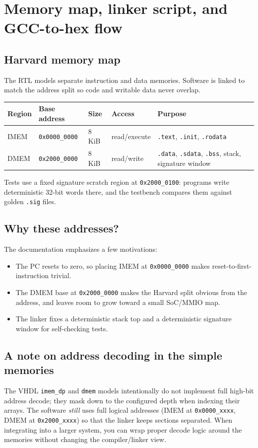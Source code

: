 \section{Memory map, linker script, and GCC-to-hex flow}

\subsection{Harvard memory map}
The RTL models separate instruction and data memories. Software is linked to
match the address split so code and writable data never overlap.

\begin{center}
\begin{tabularx}{\linewidth}{@{}l l l l X@{}}
\toprule
Region & Base address & Size & Access & Purpose \\
\midrule
IMEM & \texttt{0x0000\_0000} & 8 KiB & read/execute & \texttt{.text}, \texttt{.init}, \texttt{.rodata} \\
DMEM & \texttt{0x2000\_0000} & 8 KiB & read/write & \texttt{.data}, \texttt{.sdata}, \texttt{.bss}, stack, signature window \\
\bottomrule
\end{tabularx}
\end{center}

Tests use a fixed signature scratch region at \texttt{0x2000\_0100}: programs
write deterministic 32-bit words there, and the testbench compares them against
golden \texttt{.sig} files.

\subsection{Why these addresses?}
The documentation emphasizes a few motivations:
\begin{itemize}[leftmargin=*]
  \item The PC resets to zero, so placing IMEM at \texttt{0x0000\_0000} makes reset-to-first-instruction trivial.
  \item The DMEM base at \texttt{0x2000\_0000} makes the Harvard split obvious from the address, and leaves room to grow toward a small SoC/MMIO map.
  \item The linker fixes a deterministic stack top and a deterministic signature window for self-checking tests.
\end{itemize}

\subsection{A note on address decoding in the simple memories}
The VHDL \texttt{imem\_dp} and \texttt{dmem} models intentionally do not
implement full high-bit address decode; they mask down to the configured depth
when indexing their arrays. The
software \emph{still} uses full logical addresses (IMEM at \texttt{0x0000\_xxxx},
DMEM at \texttt{0x2000\_xxxx}) so that the linker keeps sections separated.
When integrating into a larger system, you can wrap proper decode logic around
the memories without changing the compiler/linker view.

